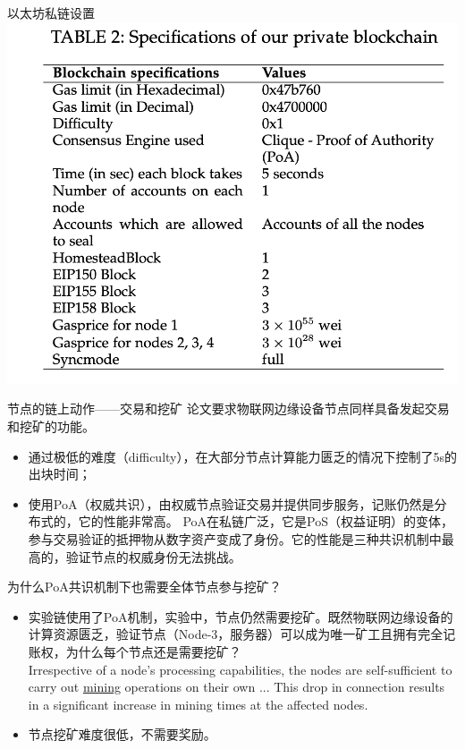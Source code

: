 \documentclass{beamer}
\begin{document}
\begin{frame}{以太坊私链设置}
	\includegraphics[width=\linewidth]{Assets/表2}
\end{frame}

\begin{frame}{节点的链上动作——交易和挖矿}
	论文要求物联网边缘设备节点同样具备发起交易和挖矿的功能。
	\begin{itemize}
		\item 通过极低的难度（difficulty），在大部分节点计算能力匮乏的情况下控制了5s的出块时间；
		\item 使用PoA（权威共识），由权威节点验证交易并提供同步服务，记账仍然是分布式的，它的性能非常高。
		PoA在私链广泛，它是PoS（权益证明）的变体，参与交易验证的抵押物从数字资产变成了身份。它的性能是三种共识机制中最高的，验证节点的权威身份无法挑战。
	\end{itemize}
\end{frame}

\begin{frame}{为什么PoA共识机制下也需要全体节点参与挖矿？}
	\begin{itemize}
		\item 实验链使用了PoA机制，实验中，节点仍然需要挖矿。既然物联网边缘设备的计算资源匮乏，验证节点（Node-3，服务器）可以成为唯一矿工且拥有完全记账权，为什么每个节点还是需要挖矿？\\
		Irrespective of a node’s processing capabilities, the nodes are self-sufficient to carry out \underline{mining} operations on their own ... This drop in connection results in a significant increase in mining times at the affected nodes.
		\item 节点挖矿难度很低，不需要奖励。
	\end{itemize}
\end{frame}
\end{document}
